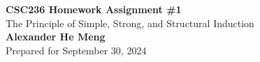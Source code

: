 \begin{titlepage}
    \null %
    \vfill
    \begin{center}
        {\fontsize{40}{48}\selectfont \bfseries CSC236 Homework Assignment \#1}
        \vspace{20pt} \\
        {\LARGE The Principle of Simple, Strong, and Structural Induction} \\
        \vspace{20pt}
        \textbf{Alexander He Meng}
        \vspace{8pt}
        \\ Prepared for September 30, 2024
    \end{center}
    \vfill
\end{titlepage}

